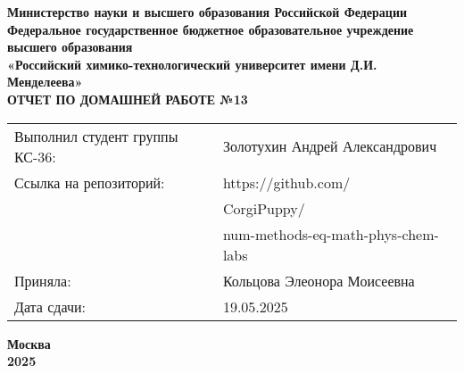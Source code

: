 \documentclass[12pt, a4paper]{report}
\begin{document}
	\begin{titlepage}
		\begin{center}
			\large \textbf{Министерство науки и высшего образования Российской Федерации} \\
			\large \textbf{Федеральное государственное бюджетное образовательное учреждение высшего образования} \\
			\large \textbf{«Российский химико-технологический университет имени Д.И. Менделеева»} \\

			\vspace*{4cm}
			\LARGE \textbf{ОТЧЕТ ПО ДОМАШНЕЙ РАБОТЕ №13}

			\vspace*{4cm}
			\begin{flushright}
				\Large
				\begin{tabular}{>{\raggedleft\arraybackslash}p{9cm} p{10cm}}
					Выполнил студент группы КС-36: & Золотухин Андрей Александрович \\
					Ссылка на репозиторий: & https://github.com/ \\
					& CorgiPuppy/ \\
					& num-methods-eq-math-phys-chem-labs \\
					Приняла: & Кольцова Элеонора Моисеевна \\
					Дата сдачи: & 19.05.2025 \\
				\end{tabular}
			\end{flushright}

			\vspace*{6cm}
			\Large \textbf{Москва \\ 2025}
		\end{center}
	\end{titlepage}

	\tableofcontents
	\thispagestyle{empty}
	\newpage

\end{document}
